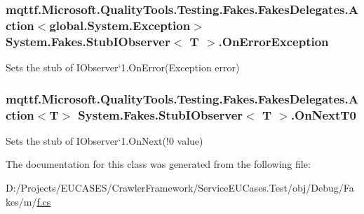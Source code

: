 \hypertarget{class_system_1_1_fakes_1_1_stub_i_observer_3_01_t_01_4_a6dd4ad9bbc18c386010d5764423cd54c}{
\subsubsection[{On\-Error\-Exception}]{\setlength{\rightskip}{0pt plus 5cm}mqttf.\-Microsoft.\-Quality\-Tools.\-Testing.\-Fakes.\-Fakes\-Delegates.\-Action$<$global.\-System.\-Exception$>$ System.\-Fakes.\-Stub\-I\-Observer$<$ T $>$.On\-Error\-Exception}}\label{class_system_1_1_fakes_1_1_stub_i_observer_3_01_t_01_4_a6dd4ad9bbc18c386010d5764423cd54c}


Sets the stub of I\-Observer`1.On\-Error(\-Exception error)

\hypertarget{class_system_1_1_fakes_1_1_stub_i_observer_3_01_t_01_4_a7d63e50d65e9348a2e1af200d566f096}{
\subsubsection[{On\-Next\-T0}]{\setlength{\rightskip}{0pt plus 5cm}mqttf.\-Microsoft.\-Quality\-Tools.\-Testing.\-Fakes.\-Fakes\-Delegates.\-Action$<$T$>$ System.\-Fakes.\-Stub\-I\-Observer$<$ T $>$.On\-Next\-T0}}\label{class_system_1_1_fakes_1_1_stub_i_observer_3_01_t_01_4_a7d63e50d65e9348a2e1af200d566f096}


Sets the stub of I\-Observer`1.On\-Next(!0 value)



The documentation for this class was generated from the following file\-:\begin{DoxyCompactItemize}
\item 
D\-:/\-Projects/\-E\-U\-C\-A\-S\-E\-S/\-Crawler\-Framework/\-Service\-E\-U\-Cases.\-Test/obj/\-Debug/\-Fakes/m/\hyperlink{m_2f_8cs}{f.\-cs}\end{DoxyCompactItemize}
